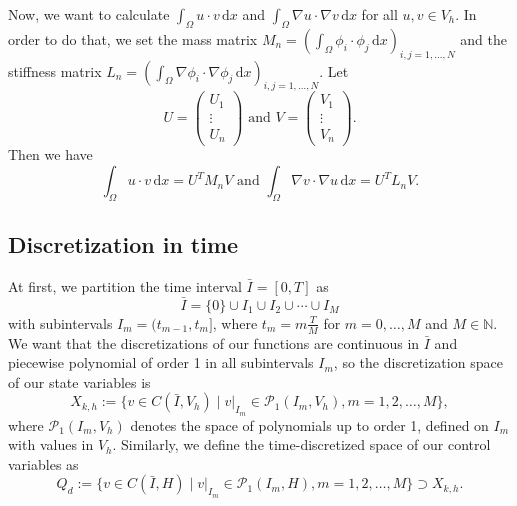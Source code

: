 Now, we want to calculate $\int_\Omega u \cdot v \,\mathrm{d}x$ and $\int_\Omega \nabla u \cdot \nabla v \,\mathrm{d}x$ for all $u,v\in  V_h$. In order to do that, we set the mass matrix $M_n = \left(\int_\Omega \phi_i \cdot \phi_j \,\mathrm{d}x\right)_{i,j=1,\dotsc,N}$ and the stiffness matrix $L_n = \left(\int_\Omega \nabla\phi_i \cdot \nabla\phi_j \,\mathrm{d}x\right)_{i,j=1,\dotsc,N}$. Let%
\begin{displaymath}
U=\begin{pmatrix} U_1 \\ \vdots \\ U_n \end{pmatrix}\text{ and }V=\begin{pmatrix} V_1 \\ \vdots \\ V_n \end{pmatrix}.
\end{displaymath}
Then we have
\begin{displaymath}
\int_\Omega u \cdot v \,\mathrm{d}x=U^TM_nV\text{ and }\int_\Omega \nabla v \cdot \nabla u \,\mathrm{d}x=U^TL_nV.
\end{displaymath}


\subsection{Discretization in time}
At first, we partition the time interval $\bar{I}=[0,T]$ as
\begin{displaymath}
\bar{I}=\{0\}\cup I_1\cup I_2\cup\dotsb\cup I_M
\end{displaymath}
with subintervals $I_m=(t_{m-1},t_m]$, where $t_m=m\frac{T}{M}$ for $m=0,\dotsc, M$ and $M\in\mathbb{N}$. We want that the discretizations of our functions are continuous in $\bar{I}$ and piecewise polynomial of order 1 in all subintervals $I_m$, so the discretization space of our state variables is
\begin{displaymath}
X_{k,h}:=\{v\in C(\bar{I},V_h)\mid v |_{I_m}\in\mathcal{P}_1(I_m,V_h),m=1,2,\dotsc,M\},
\end{displaymath}
where $\mathcal{P}_1(I_m,V_h)$ denotes the space of polynomials up to order 1, defined on $I_m$ with values in $V_h$.
Similarly, we define the time-discretized space of our control variables as
\begin{displaymath}
Q_d:=\{v\in C(\bar{I},H)\mid v |_{I_m}\in\mathcal{P}_1(I_m,H),m=1,2,\dotsc,M\}\supset X_{k,h}.
\end{displaymath}

